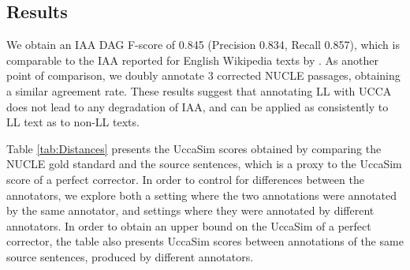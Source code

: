 \documentclass[letter,11pt]{article}
\begin{document}



\subsection{Results}

We obtain an IAA DAG F-score of 0.845
(Precision 0.834, Recall 0.857), which
is comparable to the IAA reported for English Wikipedia texts by \cite{abend2013universal}.
As another point of comparison, we doubly annotate 3 corrected NUCLE passages,
obtaining a similar agreement rate.
These results suggest that annotating LL with UCCA does not lead to any degradation
of IAA, and can be applied as consistently to LL text as to non-LL texts.

Table \ref{tab:Distances} presents the {\sc UccaSim} scores obtained by comparing the 
NUCLE gold standard and the source sentences, which is a proxy
to the {\sc UccaSim} score of a perfect corrector.
In order to control for differences between the annotators, we explore both
a setting where the two annotations were annotated by the same annotator,
and settings where they were annotated by different annotators.
In order to obtain an upper bound on the {\sc UccaSim} of a perfect corrector,
the table also presents {\sc UccaSim} scores between annotations of
the same source sentences, produced by different annotators.
\end{document}
